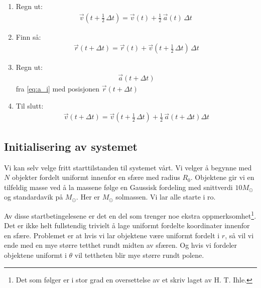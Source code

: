 \documentclass[11pt, twocolumn]{article}
\begin{document}
\begin{enumerate}
\item Regn ut: \begin{align*}
\vec{v}\left(t + \tfrac12\,\Delta t\right) = \vec{v}(t) + \tfrac12\,\vec{a}(t)\,\Delta t\ 
\end{align*}


\item Finn så: \begin{align*} \vec{r}(t + \Delta t) = \vec{r}(t) + \vec{v}\left(t + \tfrac12\,\Delta t\right)\, \Delta t \end{align*}


\item Regn ut: \begin{align*} \vec{a}(t + \Delta t) 
\end{align*} fra \eqref{eq:a_i} med posisjonen $ \vec{r}(t + \Delta t) $


\item Til slutt: \begin{align*} \vec{v}(t + \Delta t) = \vec{v}\left(t + \tfrac12\,\Delta t\right) + \tfrac12\,\vec{a}(t + \Delta t)\Delta t \end{align*}
\end{enumerate}

\subsection{Initialisering av systemet}
Vi kan selv velge fritt starttilstanden til systemet vårt. Vi velger å
begynne med $N$ objekter fordelt uniformt innenfor en sfære med
radius $R_0$. Objektene gir vi en tilfeldig masse ved å la massene
følge en Gaussisk fordeling med snittverdi $10M_\odot$ og standardavik
på $M_\odot$. Her er $M_\odot$ solmassen. Vi lar alle starte i ro. 

Av disse startbetingelesene er det en del som trenger noe ekstra
oppmerksomhet\footnote{Det som følger er i stor grad en oversettelse
  av et skriv laget av H. T. Ihle.}. Det er ikke helt fullstendig trivielt å lage uniformt
fordelte koordinater innenfor en sfære. Problemet er at hvis vi lar
objektene være uniformt fordelt i $r$, så vil vi ende med en mye
større tetthet rundt midten av sfæren. Og hvis vi fordeler objektene
uniformt i $\theta$ vil tettheten blir mye større rundt polene. 
\end{document}

